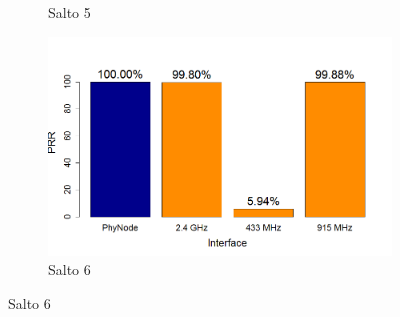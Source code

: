 \documentclass[
	12pt,				%
	openright,			%
	oneside,
	a4paper,			%
	english,			%
	french,				%
	spanish,			%
	brazil				%
	]{abntex2}
\begin{document}
\begin{figure}[htb]
\begin{subfigure}{.5\textwidth}
		\captionsetup{width=.9\textwidth}
		\caption{Salto 5}
		\label{prr_no_opt_s5}
	\end{subfigure}%
	\begin{subfigure}{.5\textwidth}
		\centering
		\includegraphics[width=.98\linewidth]{PRR_Salto6}
		\captionsetup{width=.9\textwidth}
		\caption{Salto 6}
		\label{prr_no_opt_s6}
	\end{subfigure}
\end{figure}
\end{document}
